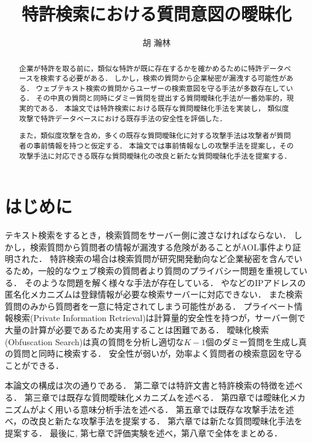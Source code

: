 \documentclass[master]{suribt}
\title{特許検索における質問意図の曖昧化}
\author{胡 瀚林}
\theoremstyle{definition}
\begin{document}
\maketitle%

\frontmatter%
\begin{abstract}%
 企業が特許を取る前に，類似な特許が既に存在するかを確かめるために特許データベースを検索する必要がある．
 しかし，検索の質問から企業秘密が漏洩する可能性がある．
 ウェブテキスト検索の質問からユーザーの検索意図を守る手法が多数存在している．
 その中真の質問と同時にダミー質問を提出する質問曖昧化手法が一番効率的，現実的である．
 本論文では特許検索における既存な質問曖昧化手法\cite{providing2009,embellishing2010,masking2014}を実装し，
 類似度攻撃\cite{simattack2016}で特許データベースにおける既存手法の安全性を評価した．

 また，類似度攻撃\cite{simattack2016}を含め，多くの既存な質問曖昧化に対する攻撃手法は攻撃者が質問者の事前情報を持つと仮定する．
 本論文では事前情報なしの攻撃手法を提案し，その攻撃手法に対応できる既存な質問曖昧化の改良と新たな質問曖昧化手法を提案する．
\end{abstract}

 \tableofcontents%

 \mainmatter%
 \chapter{はじめに}

 テキスト検索をするとき，検索質問をサーバー側に渡さなければならない．
 しかし，検索質問から質問者の情報が漏洩する危険があることがAOL事件\cite{AOL}より証明された．
 特許検索の場合は検索質問が研究開発動向など企業秘密を含んでいるため，一般的なウェブ検索の質問者より質問のプライバシー問題を重視している．
 そのような問題を解く様々な手法が存在している．
 \cite{tor2004}や\cite{private2007}などのIPアドレスの匿名化メカニズムは登録情報が必要な検索サーバーに対応できない．
 また検索質問のみから質問者を一意に特定されてしまう可能性がある．
 プライベート情報検索(Private Information Retrieval)\cite{pir1998}は計算量的安全性を持つが，サーバー側で大量の計算が必要であるため実用することは困難である．
 曖昧化検索(Obfuscation Search)\cite{obs2012}は真の質問を分析し適切な$K−1$個のダミー質問を生成し真の質問と同時に検索する．
 安全性が弱いが，効率よく質問者の検索意図を守ることができる．
 

 本論文の構成は次の通りである．
 第二章では特許文書と特許検索の特徴を述べる．
 第三章では既存な質問曖昧化メカニズム\cite{providing2009,embellishing2010,masking2014}を述べる．
 第四章では曖昧化メカニズムがよく用いる意味分析手法を述べる．
 第五章では既存な攻撃手法\cite{simattack2016}を述べ，\cite{simattack2016}の改良と新たな攻撃手法を提案する．
 第六章では新たな質問曖昧化手法を提案する．
 最後に, 第七章で評価実験を述べ，第八章で全体をまとめる．
\end{document}
